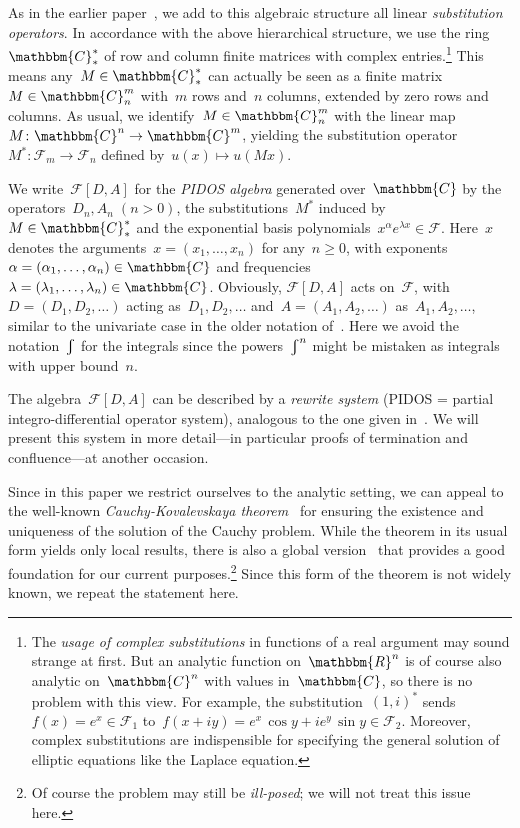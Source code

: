 \documentclass[a4paper]{llncs}
\let\mathbb\mathbbm
\newcommand{\RR}{\mathbb{R}}
\newcommand{\CC}{\mathbb{C}}
\newcommand{\mat}[3]{#1^{#2}_{#3}}
\newcommand{\der}{D}
\newcommand{\cum}{{\textstyle \varint}}
\newcommand{\galg}{\mathcal{F}}
\newcommand{\func}[2]{\galg^{#1}_{#2}}
\begin{document}
As in the earlier paper~\cite{RosenkranzRegensburgerTecBuchberger2009}, we add
to this algebraic structure all linear \emph{substitution operators}. In
accordance with the above hierarchical structure, we use the
ring~$\mat{\CC}{*}{*}$ of row and column finite matrices with complex
entries.\footnote{The \emph{usage of complex substitutions} in functions of a
  real argument may sound strange at first. But an analytic function on~$\RR^n$
  is of course also analytic on~$\CC^n$ with values in~$\CC$, so there is no
  problem with this view. For example, the substitution~$(1,i)^*$ sends~$f(x) =
  e^x \in \func{}{1}$ to~$f(x+iy) = e^x \, \cos{y} + ie^y \, \sin{y} \in
  \func{}{2}$. Moreover, complex substitutions are indispensible for specifying
  the general solution of elliptic equations like the Laplace equation.}  This
means any~$M \in \mat{\CC}{*}{*}$ can actually be seen as a finite matrix~$M \in
\mat{\CC}{m}{n}$ with~$m$ rows and~$n$ columns, extended by zero rows and
columns. As usual, we identify~$M \in \mat{\CC}{m}{n}$ with the linear
map~$M\colon \CC^n \to \CC^m$, yielding the substitution operator~$M^*\colon
\func{}{m} \to \func{}{n}$ defined by~$u(x) \mapsto u(Mx)$.

We write~$\galg[D,A]$ for the \emph{PIDOS algebra} generated over~$\CC$ by the
operators~$\der_n, A_n \; (n>0)$, the substitutions~$M^*$ induced by~$M \in
\mat{\CC}{*}{*}$ and the exponential basis polynomials~$x^\alpha e^{\lambda x}
\in \galg$. Here~$x$ denotes the arguments~$x = (x_1, \dots, x_n)$ for any~$n
\ge 0$, with exponents~$\alpha = (\alpha_1, \dots, \alpha_n) \in \CC$ and
frequencies~$\lambda = (\lambda_1, \dots, \lambda_n) \in \CC$. Obviously,
$\galg[D,A]$ acts on~$\galg$, with~$D = (D_1, D_2, \dots)$ acting as~$\der_1,
\der_2, \dots$ and~$A = (A_1, A_2, \dots)$ as~$A_1, A_2, \dots$, similar
to the univariate case in the older notation of~\cite{Rosenkranz2005}. Here we
avoid the notation~$\cum$ for the integrals since the powers~$\cum^n$ might be
mistaken as integrals with upper bound~$n$.

The algebra~$\galg[D,A]$ can be described by a \emph{rewrite system} (PIDOS =
partial integro-differential operator system), analogous to the one given
in~\cite{RosenkranzRegensburgerTecBuchberger2009}. We will present this system
in more detail---in particular proofs of termination and confluence---at another
occasion.

Since in this paper we restrict ourselves to the analytic setting, we can appeal
to the well-known \emph{Cauchy-Kovalevskaya
  theorem}~\cite[Thm.~2.22]{RenardyRogers2004} for ensuring the existence and
uniqueness of the solution of the Cauchy problem. While the theorem in its usual
form yields only local results, there is also a global
version~\cite[Thm.~7.4]{Knapp2005} that provides a good foundation for our
current purposes.\footnote{Of course the problem may still be \emph{ill-posed};
  we will not treat this issue here.} Since this form of the theorem is not
widely known, we repeat the statement here.
\end{document}
